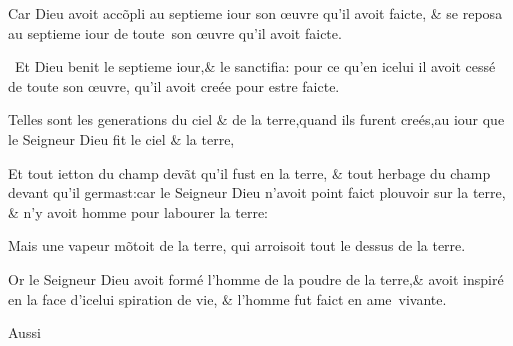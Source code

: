 \bverse \footnotemarkmain{}Car Dieu avoit acc\~opli au septie\-me
iour son \oe{}uvre qu'il avoit faicte, \lb
\footnotemarkmain{}\& se reposa au septieme iour de tou\-te~son
\oe{}uvre qu'il avoit faicte.

\bverse Et Dieu \footnotemarkmain{}benit le septieme iour,\& le
sanctifia: pour ce qu'en icelui il avoit
cessé de toute son \oe{}uvre, qu'il avoit
creée pour estre faicte.

\bverse Telles sont les generations du ciel
\& de la terre,quand ils furent creés,au
iour que le Seigneur Dieu fit le ciel \&
la terre,

\bverse Et tout ietton du champ dev\~at qu'il
fust en la terre, \& tout herbage du
champ devant qu'il germast:car le Sei\-gneur
Dieu n'avoit point faict \footnotemarkmain{}plou\-voir
sur la terre, \& n'y avoit homme
pour labourer la terre:

\bverse Mais une vapeur m\~otoit de la terre,
qui arroisoit tout le dessus de la terre.

\bverse Or le Seigneur Dieu avoit formé
l'homme \footnotemarkmain{}de la poudre
de la terre,\footnotemarkmain{}\&
avoit inspiré en la face d'icelui spira\-tion
de vie, \& l'homme fut faict en
ame~vivante.

\vspace{-0.5cm}
\begin{flushright}
Aussi
\end{flushright}


